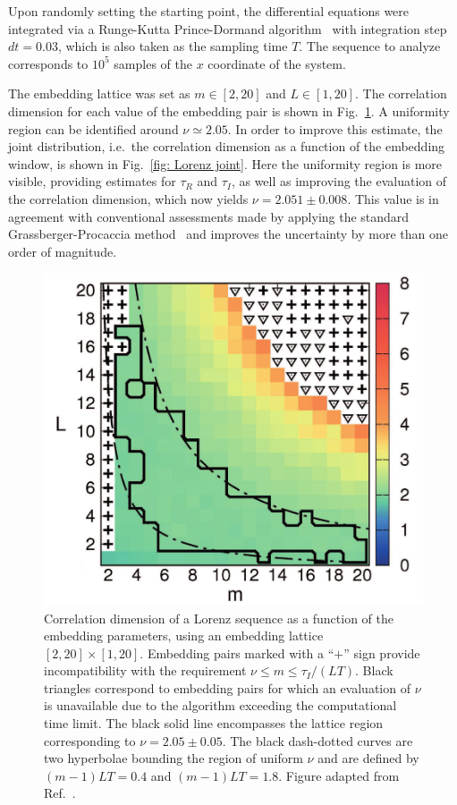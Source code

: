 Upon randomly setting the starting point, the differential equations were integrated via
a Runge-Kutta Prince-Dormand algorithm~\cite{dormand1986runge} with integration
step $dt = 0.03$, which is also taken as the sampling time $T$.
The sequence to analyze corresponds to $10^5$ samples of the $x$ coordinate of the system.

The embedding lattice was set as $m\in[2,20]$ and $L\in[1,20]$. 
The correlation dimension for each value of the embedding pair is shown in Fig.~\ref{fig: Lorenz heatmap}.
A uniformity region can be identified around $\nu\simeq2.05$.
In order to improve this estimate, the joint distribution, i.e.\ the correlation dimension as a function
of the embedding window, is shown in Fig.~\ref{fig: Lorenz joint}.
Here the uniformity region is more visible, providing estimates for $\tau_R$ and $\tau_I$, as well as
improving the evaluation of the correlation dimension, which now yields $\nu=2.051 \pm 0.008$.
This value is in agreement with
conventional assessments made by applying the standard Grassberger-Procaccia method~\cite{ref:bradley2015nonlinear,sprott2001improved}
and improves the uncertainty by more than one order of magnitude.

\begin{figure}[!htbp]
\centering
\includegraphics[width=.6\linewidth]{images/heatmap_Lorenz.png}
\caption{Correlation dimension of a Lorenz sequence as a function of the embedding parameters, using an embedding lattice
$[2, 20]\times[1, 20]$. Embedding pairs marked with a ``$+$'' sign provide incompatibility with the
requirement $\nu \leq m \leq \tau_I/(LT)$. Black triangles correspond to embedding pairs for which
an evaluation of $\nu$ is unavailable due to the algorithm exceeding the computational time limit.
The black solid line encompasses the lattice region corresponding to $\nu=2.05\pm0.05$.
The black dash-dotted curves are two hyperbolae bounding the region of uniform $\nu$ and
are defined by $(m-1)LT=0.4$ and $(m-1)LT=1.8$.
Figure adapted from Ref.~\cite{ref:perinelli2020chasing}.
}\label{fig: Lorenz heatmap}
\end{figure}

